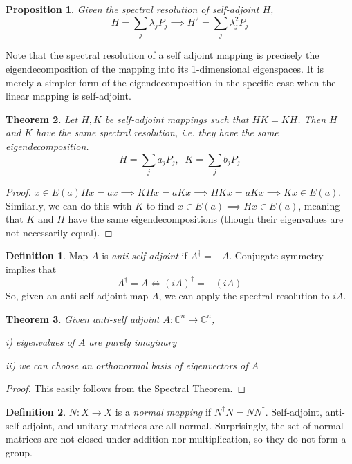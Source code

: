 \documentclass{article}
\newtheorem{theorem}{Theorem}[section]
\newtheorem{proposition}[theorem]{Proposition}
\theoremstyle{remark}
\theoremstyle{definition}
\newtheorem{definition}{Definition}[section]
\begin{document}
\begin{proposition}
Given the spectral resolution of self-adjoint $H$, 
\[H  = \sum_j \lambda_j P_j \implies H^2 = \sum_j \lambda_j^2 P_j\]
\end{proposition}

Note that the spectral resolution of a self adjoint mapping is precisely the eigendecomposition of the mapping into its 1-dimensional eigenspaces. It is merely a simpler form of the eigendecomposition in the specific case when the linear mapping is self-adjoint. 

\begin{theorem}
Let $H, K$ be self-adjoint mappings such that $H K = K H$. Then $H$ and $K$ have the same spectral resolution, i.e. they have the same eigendecomposition. 
\[H = \sum_j a_j P_j, \; \; K = \sum_j b_j P_j\]
\end{theorem}
\begin{proof}
$ x \in E(a) H x = a x \implies K H x = a K x \implies H K x = a K x \implies K x \in E(a)$. Similarly, we can do this with $K$ to find $x \in E(a) \implies H x \in E(a)$, meaning that $K$ and $H$ have the same eigendecompositions (though their eigenvalues are not necessarily equal). 
\end{proof}

\begin{definition}
Map $A$ is \textit{anti-self adjoint }if $A^\dagger = - A$. Conjugate symmetry implies that
\[ A^\dagger = A \iff (i A)^\dagger = - (i A)\]
So, given an anti-self adjoint map $A$, we can apply the spectral resolution to $iA$. 
\end{definition}

\begin{theorem}
Given anti-self adjoint $A: \mathbb{C}^n \longrightarrow \mathbb{C}^n$, 

i) eigenvalues of $A$ are purely imaginary

ii) we can choose an orthonormal basis of eigenvectors of $A$
\end{theorem}

\begin{proof}
This easily follows from the Spectral Theorem. 
\end{proof}

\begin{definition}
$N: X \longrightarrow X$ is a \textit{normal mapping} if $N^\dagger N = N N^\dagger$. Self-adjoint, anti-self adjoint, and unitary matrices are all normal. Surprisingly, the set of normal matrices are not closed under addition nor multiplication, so they do not form a group. 
\end{definition}
\end{document}
